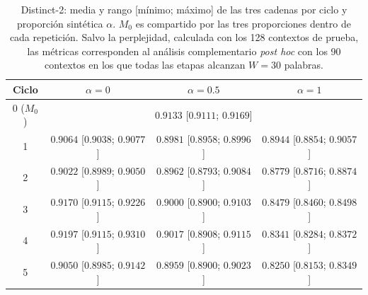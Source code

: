
\begin{table}[ht]
\centering
\footnotesize
\begin{tabular}{c c c c}
\hline
Ciclo & $\alpha=0$ & $\alpha=0.5$ & $\alpha=1$ \\
\hline
0 ($M_0$) & \multicolumn{3}{c}{$0.9133$ [$0.9111$; $0.9169$]} \\
1 & $0.9064$ [$0.9038$; $0.9077$] & $0.8981$ [$0.8958$; $0.8996$] & $0.8944$ [$0.8854$; $0.9057$] \\
2 & $0.9022$ [$0.8989$; $0.9050$] & $0.8962$ [$0.8793$; $0.9084$] & $0.8779$ [$0.8716$; $0.8874$] \\
3 & $0.9170$ [$0.9115$; $0.9226$] & $0.9000$ [$0.8900$; $0.9103$] & $0.8479$ [$0.8460$; $0.8498$] \\
4 & $0.9197$ [$0.9115$; $0.9310$] & $0.9017$ [$0.8908$; $0.9115$] & $0.8341$ [$0.8284$; $0.8372$] \\
5 & $0.9050$ [$0.8985$; $0.9142$] & $0.8959$ [$0.8900$; $0.9023$] & $0.8250$ [$0.8153$; $0.8349$] \\
\hline
\end{tabular}
\caption{Distinct-2: media y rango [mínimo; máximo] de las tres cadenas por ciclo y proporción sintética $\alpha$. $M_0$ es compartido por las tres proporciones dentro de cada repetición. Salvo la perplejidad, calculada con los 128 contextos de prueba, las métricas corresponden al análisis complementario \textit{post hoc} con los 90 contextos en los que todas las etapas alcanzan $W=30$ palabras.}
\label{tab:medias_distinct_2}
\end{table}
